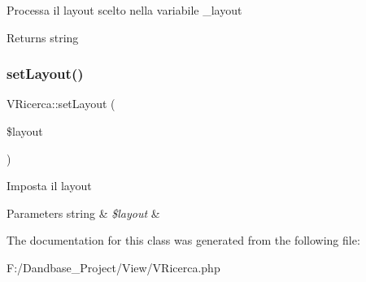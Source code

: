 Processa il layout scelto nella variabile \+\_\+layout

\begin{DoxyReturn}{Returns}
string 
\end{DoxyReturn}
\mbox{\label{class_v_ricerca_ac5f6a699be0236cd12a8954b309803c0}} 
\subsubsection{\texorpdfstring{set\+Layout()}{setLayout()}}
{\footnotesize\ttfamily V\+Ricerca\+::set\+Layout (\begin{DoxyParamCaption}\item[{}]{\$layout }\end{DoxyParamCaption})}

Imposta il layout


\begin{DoxyParams}[1]{Parameters}
string & {\em \$layout} & \\
\hline
\end{DoxyParams}


The documentation for this class was generated from the following file\+:\begin{DoxyCompactItemize}
\item 
F\+:/\+Dandbase\+\_\+\+Project/\+View/V\+Ricerca.\+php\end{DoxyCompactItemize}
